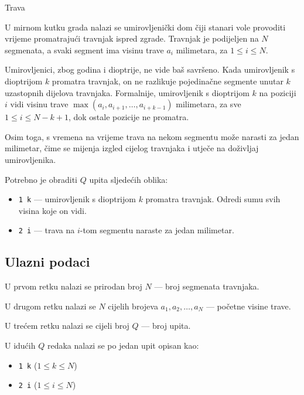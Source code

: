 \begin{statement}[
  problempoints=100,
  timelimit=1 sekunda,
  memorylimit=512 MiB,
]{Trava}\

U mirnom kutku grada nalazi se umirovljenički dom čiji stanari vole provoditi vrijeme promatrajući travnjak ispred zgrade. Travnjak je podijeljen na $N$ segmenata, a svaki segment ima visinu trave $a_i$ milimetara, za $1 \leq i \leq N$.

Umirovljenici, zbog godina i dioptrije, ne vide baš savršeno. Kada umirovljenik s dioptrijom $k$ promatra travnjak, on ne razlikuje pojedinačne segmente unutar $k$ uzastopnih dijelova travnjaka. Formalnije, umirovljenik s dioptrijom $k$ na poziciji $i$ vidi visinu trave $\max(a_i, a_{i+1}, \ldots, a_{i+k-1})$ milimetara, za sve $1 \leq i \leq N - k + 1$, dok ostale pozicije ne promatra.

Osim toga, s vremena na vrijeme trava na nekom segmentu može narasti za jedan milimetar, čime se mijenja izgled cijelog travnjaka i utječe na doživljaj umirovljenika.

Potrebno je obraditi $Q$ upita sljedećih oblika:
\vspace{-0.7em}
\begin{itemize}
    \item \texttt{1 k} — umirovljenik s dioptrijom $k$ promatra travnjak. Odredi sumu svih visina koje on vidi.
    \item \texttt{2 i} — trava na $i$-tom segmentu naraste za jedan milimetar.
\end{itemize}

\subsection*{Ulazni podaci}

U prvom retku nalazi se prirodan broj $N$ — broj segmenata travnjaka.

U drugom retku nalazi se $N$ cijelih brojeva $a_1, a_2, \ldots, a_N$ — početne visine trave.

U trećem retku nalazi se cijeli broj $Q$ — broj upita.

U idućih $Q$ redaka nalazi se po jedan upit opisan kao:
\vspace{-0.7em}
\begin{itemize}
    \item \texttt{1 k} ($1 \leq k \leq N$)
    \item \texttt{2 i} ($1 \leq i \leq N$)
\end{itemize}


\end{statement}
